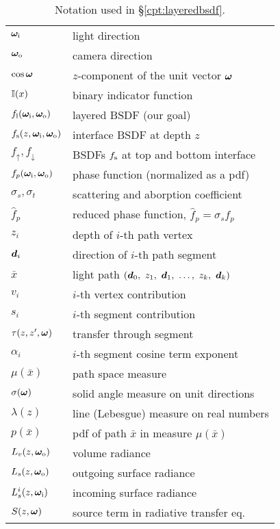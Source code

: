 \begin{table}[h]
	\centering
	\caption[Notation used in \S\ref{cpt:layeredbsdf}]{\label{tab:layeredbsdf:notation}
		Notation used in \S\ref{cpt:layeredbsdf}.
	}
	\renewcommand{\arraystretch}{1.1}
	\begin{tabular}{ll}
		$\bm\omega_\mathrm{i}$ & light direction \\
		$\bm\omega_\mathrm{o}$ & camera direction \\
		$\cos \bm\omega$ & $z$-component of the unit vector $\bm\omega$ \\
		$\mathbb{I}(x)$ & binary indicator function \\
		\hline
		
		$f_\mathrm{l}(\bm\omega_\mathrm{i}, \bm\omega_\mathrm{o})$ & layered BSDF (our goal) \\
		$f_\mathrm{s}(z, \bm\omega_\mathrm{i}, \bm\omega_\mathrm{o})$ & interface BSDF at depth $z$ \\
		$f_\uparrow, f_\downarrow$ & BSDFs $f_\mathrm{s}$ at top and bottom interface \\
		$f_p(\bm\omega_\mathrm{i}, \bm\omega_\mathrm{o})$ & phase function (normalized as a pdf) \\
		$\sigma_s, \sigma_t$ & scattering and aborption coefficient \\
		$\hat f_p$ & reduced phase function, $\hat f_p = \sigma_s f_p$ \\
		\hline
		
		$z_i$ & depth of $i$-th path vertex \\
		$\bm{d}_i$ & direction of $i$-th path segment \\
		$\bar x$ & light path $(\bmd_0,\ z_1,\ \bmd_1,\ \dots,\ z_k,\ \bmd_k)$ \\
		$v_i$ & $i$-th vertex contribution \\
		$s_i$ & $i$-th segment contribution \\
		$\tau(z, z', \bm\omega)$ & transfer through segment \\
		$\alpha_i$ & $i$-th segment cosine term exponent \\
		$\mu(\bar x)$ & path space measure \\
		$\sigma(\bm\omega)$ & solid angle measure on unit directions \\
		$\lambda(z)$ & line (Lebesgue) measure on real numbers \\
		$p(\bar x)$ & pdf of path $\bar x$ in measure $\mu(\bar x)$ \\
		\hline
		
		$L_v(z, \bm\omega_\mathrm{o})$ & volume radiance \\
		$L_s(z, \bm\omega_\mathrm{o})$ & outgoing surface radiance \\
		$L^i_s(z, \bm\omega_\mathrm{i})$ & incoming surface radiance \\
		$S(z, \bm\omega)$ & source term in radiative transfer eq. \\
	\end{tabular}
\end{table}
